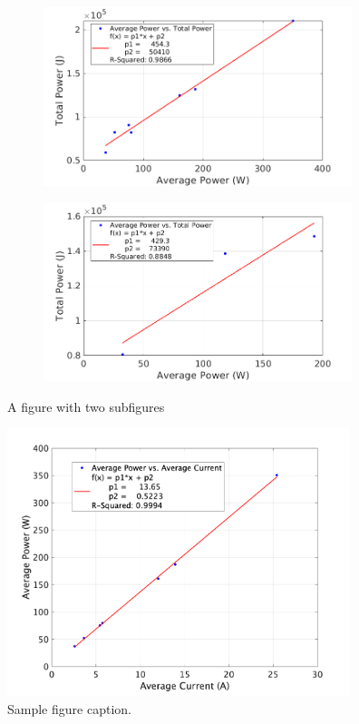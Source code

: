\documentclass{article}
\begin{document}
\begin{figure}
\centering
\begin{subfigure}[b]{0.5\textwidth}
  \centering
   \includegraphics[width=90mm]{images/AvgTotPwr.png}
  \label{fig:sub1}
\end{subfigure}%
\begin{subfigure}[b]{0.5\textwidth}
  \centering
  \includegraphics[width=90mm]{images/AvgTotPwr2.png}
  \label{fig:sub2}
\end{subfigure}
\caption{A figure with two subfigures}
\label{fig:test}
\end{figure}

\begin{figure}
  \centering
  \includegraphics[width = 100mm]{images/CurrToPwr.png}
  \caption{Sample figure caption.}
  \label{fig:fig1}
\end{figure}
\end{document}
